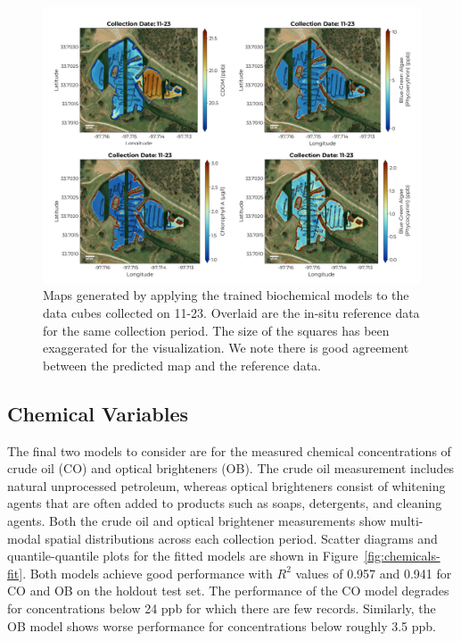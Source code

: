 \documentclass[remotesensing,article,submit,pdftex,moreauthors]{Definitions/mdpi}
\begin{document}
\begin{figure}
\centering
\vspace{-0.3in}
\includegraphics[width=\columnwidth]{paper/figures/results/maps/biochemical.pdf}
\vspace{-0.2in}
\caption{Maps generated by applying the trained biochemical models to the data cubes collected on 11-23. Overlaid are the in-situ reference data for the same collection period. The size of the squares has been exaggerated for the visualization. We note there is good agreement between the predicted map and the reference data. \label{fig:map-biochem}}
\end{figure}  


\subsection{Chemical Variables}

The final two models to consider are for the measured chemical concentrations of crude oil (CO) and optical brighteners (OB). The crude oil measurement includes natural unprocessed petroleum, whereas optical brighteners consist of whitening agents that are often added to products such as soaps, detergents, and cleaning agents. Both the crude oil and optical brightener measurements show multi-modal spatial distributions across each collection period. Scatter diagrams and quantile-quantile plots for the fitted models are shown in Figure~\ref{fig:chemicals-fit}. Both models achieve good performance with $R^2$ values of 0.957 and 0.941 for CO and OB on the holdout test set. The performance of the CO model degrades for concentrations below 24 ppb for which there are few records. Similarly, the OB model shows worse performance for concentrations below roughly 3.5 ppb.
\end{document}
